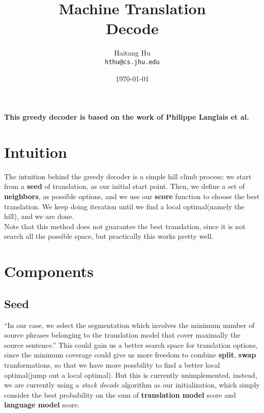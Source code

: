 \documentclass[11pt]{article}
\title{Machine Translation\\Decode}
\author{Haitang Hu \\
  {\tt hthu@cs.jhu.edu}}
\date{\today}
\begin{document}
\large
\maketitle
\thispagestyle{headings}
\noindent
\textbf{This greedy decoder is based on the work of Philippe Langlais et al.\cite{greedy}}

\section{Intuition} %
\label{sec:intuition}
The intuition behind the greedy decoder is a simple hill climb process: we start from a \textbf{seed} of translation, as our initial start point. Then, we define a set of \textbf{neighbors}, as possible options, and we use our \textbf{score} function to choose the best translation. We keep doing iteration until we find a local optimal(namely the hill), and we are done.\\
Note that this method does not guarantee the best translation, since it is not search all the possible space, but practically this works pretty well. 

\section{Components} %
\label{sec:components}
\subsection{Seed} %
\label{sub:seed}
``In our case, we select the segmentation which involves the minimum number of source phrases belonging to the translation model that cover maximally the source sentence.\cite{greedy}'' This could gain us a better search space for translation options, since the minimum coverage could give us more freedom to combine \textbf{split}, \textbf{swap} tranformations, so that we have more possbility to find a better local optimal(jump out a local optimal). But this is currently unimplemented, instead, we are currently using a \textit{stack decode} algorithm as our initialization, which simply consider the best probability on the sum of \textbf{translation model} score and \textbf{language model} score.
\end{document}
